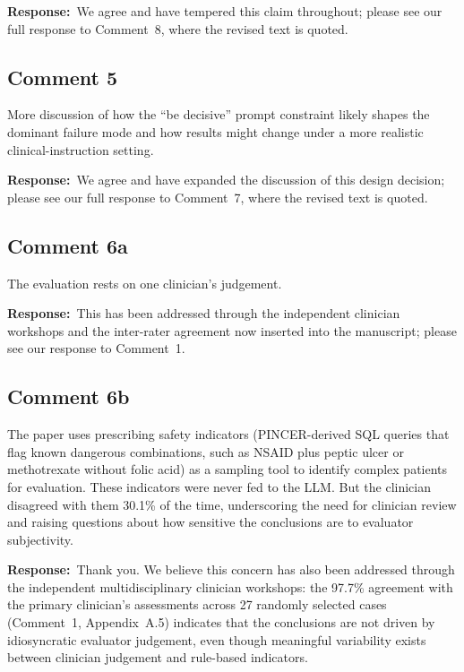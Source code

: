 \documentclass[11pt,a4paper]{article}
\newcounter{rcomment}
\newcommand{\response}{\noindent\textbf{Response:}\ }
\begin{document}
\response We agree and have tempered this claim throughout; please see our full response to Comment~8, where the revised text is quoted.

\subsection*{Comment 5}
\begin{reviewercomment}
More discussion of how the ``be decisive'' prompt constraint likely shapes the dominant failure mode and how results might change under a more realistic clinical-instruction setting.
\end{reviewercomment}

\response We agree and have expanded the discussion of this design decision; please see our full response to Comment~7, where the revised text is quoted.

\subsection*{Comment 6a}
\begin{reviewercomment}
The evaluation rests on one clinician's judgement.
\end{reviewercomment}

\response This has been addressed through the independent clinician workshops and the inter-rater agreement now inserted into the manuscript; please see our response to Comment~1.

\subsection*{Comment 6b}
\begin{reviewercomment}
The paper uses prescribing safety indicators (PINCER-derived SQL queries that flag known dangerous combinations, such as NSAID plus peptic ulcer or methotrexate without folic acid) as a sampling tool to identify complex patients for evaluation. These indicators were never fed to the LLM. But the clinician disagreed with them 30.1\% of the time, underscoring the need for clinician review and raising questions about how sensitive the conclusions are to evaluator subjectivity.
\end{reviewercomment}

\response Thank you. We believe this concern has also been addressed through the independent multidisciplinary clinician workshops: the 97.7\% agreement with the primary clinician's assessments across 27 randomly selected cases (Comment~1, Appendix~A.5) indicates that the conclusions are not driven by idiosyncratic evaluator judgement, even though meaningful variability exists between clinician judgement and rule-based indicators.
\end{document}
